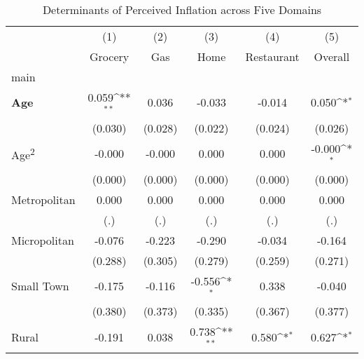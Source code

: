 \begin{table}[htbp]\centering
\def\sym#1{\ifmmode^{#1}\else\(^{#1}\)\fi}
\caption{Determinants of Perceived Inflation across Five Domains}
\begin{tabular}{l*{5}{c}}
\hline\hline
                    &\multicolumn{1}{c}{(1)}&\multicolumn{1}{c}{(2)}&\multicolumn{1}{c}{(3)}&\multicolumn{1}{c}{(4)}&\multicolumn{1}{c}{(5)}\\
                    &\multicolumn{1}{c}{Grocery}&\multicolumn{1}{c}{Gas}&\multicolumn{1}{c}{Home}&\multicolumn{1}{c}{Restaurant}&\multicolumn{1}{c}{Overall}\\
\hline
main                &                     &                     &                     &                     &                     \\
\textbf{Age}        &       0.059\sym{**} &       0.036         &      -0.033         &      -0.014         &       0.050\sym{*}  \\
                    &     (0.030)         &     (0.028)         &     (0.022)         &     (0.024)         &     (0.026)         \\
[1em]
Age\textsuperscript{2}&      -0.000         &      -0.000         &       0.000         &       0.000         &      -0.000\sym{*}  \\
                    &     (0.000)         &     (0.000)         &     (0.000)         &     (0.000)         &     (0.000)         \\
[1em]
Metropolitan        &       0.000         &       0.000         &       0.000         &       0.000         &       0.000         \\
                    &         (.)         &         (.)         &         (.)         &         (.)         &         (.)         \\
[1em]
Micropolitan        &      -0.076         &      -0.223         &      -0.290         &      -0.034         &      -0.164         \\
                    &     (0.288)         &     (0.305)         &     (0.279)         &     (0.259)         &     (0.271)         \\
[1em]
Small Town          &      -0.175         &      -0.116         &      -0.556\sym{*}  &       0.338         &      -0.040         \\
                    &     (0.380)         &     (0.373)         &     (0.335)         &     (0.367)         &     (0.377)         \\
[1em]
Rural               &      -0.191         &       0.038         &       0.738\sym{**} &       0.580\sym{*}  &       0.627\sym{*}  \\

\end{tabular}
\end{table}
